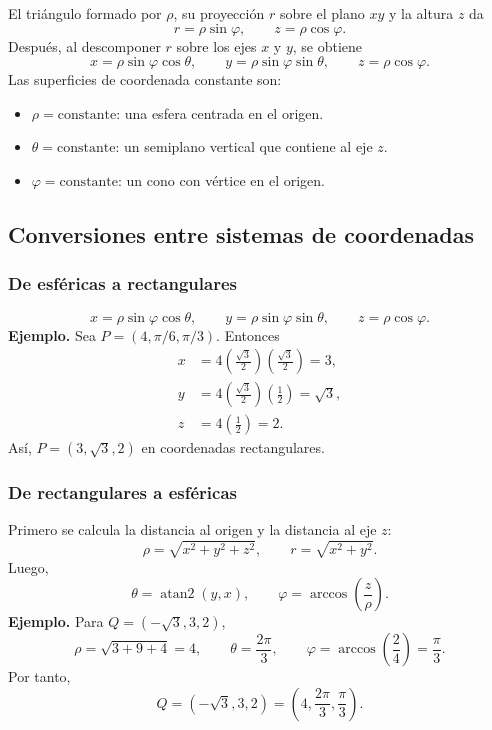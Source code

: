 El triángulo formado por $\rho$, su proyección $r$ sobre el plano $xy$ y la altura $z$ da
\[
r=\rho\sin\varphi,
\qquad
z=\rho\cos\varphi.
\]
Después, al descomponer $r$ sobre los ejes $x$ y $y$, se obtiene
\[
x=\rho\sin\varphi\cos\theta,
\qquad
y=\rho\sin\varphi\sin\theta,
\qquad
z=\rho\cos\varphi.
\]
Las superficies de coordenada constante son:
\begin{itemize}
    \item $\rho=\text{constante}$: una esfera centrada en el origen.
    \item $\theta=\text{constante}$: un semiplano vertical que contiene al eje $z$.
    \item $\varphi=\text{constante}$: un cono con vértice en el origen.
\end{itemize}

\subsection{Conversiones entre sistemas de coordenadas}

\subsubsection*{De esféricas a rectangulares}

\[
\boxed{
x=\rho\sin\varphi\cos\theta,
\qquad
y=\rho\sin\varphi\sin\theta,
\qquad
z=\rho\cos\varphi.}
\]
\textbf{Ejemplo.} Sea $P=(4,\pi/6,\pi/3)$. Entonces
\begin{align*}
x&=4\left(\frac{\sqrt{3}}{2}\right)\left(\frac{\sqrt{3}}{2}\right)=3,\\
y&=4\left(\frac{\sqrt{3}}{2}\right)\left(\frac{1}{2}\right)=\sqrt{3},\\
z&=4\left(\frac{1}{2}\right)=2.
\end{align*}
Así, $P=(3,\sqrt{3},2)$ en coordenadas rectangulares.

\subsubsection*{De rectangulares a esféricas}

Primero se calcula la distancia al origen y la distancia al eje $z$:
\[
\rho=\sqrt{x^2+y^2+z^2},
\qquad
r=\sqrt{x^2+y^2}.
\]
Luego,
\[
\boxed{
\theta=\operatorname{atan2}(y,x),
\qquad
\varphi=\arccos\left(\frac{z}{\rho}\right).}
\]
\textbf{Ejemplo.} Para $Q=(-\sqrt{3},3,2)$,
\[
\rho=\sqrt{3+9+4}=4,
\qquad
\theta=\frac{2\pi}{3},
\qquad
\varphi=\arccos\left(\frac{2}{4}\right)=\frac{\pi}{3}.
\]
Por tanto,
\[
Q=(-\sqrt{3},3,2)=\left(4,\frac{2\pi}{3},\frac{\pi}{3}\right).
\]

